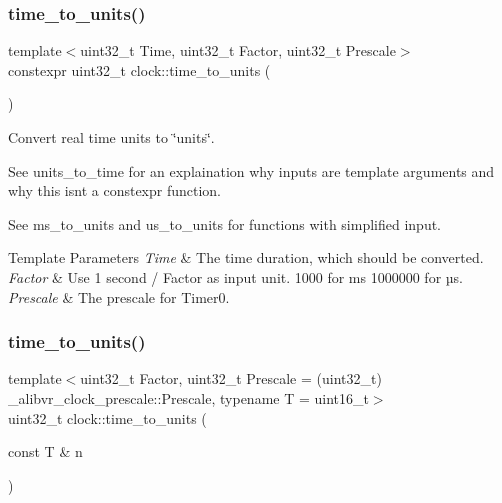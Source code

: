 \subsubsection{\texorpdfstring{time\+\_\+to\+\_\+units()}{time\_to\_units()}\hspace{0.1cm}{\footnotesize\ttfamily [1/2]}}
{\footnotesize\ttfamily template$<$uint32\+\_\+t Time, uint32\+\_\+t Factor, uint32\+\_\+t Prescale$>$ \\
constexpr uint32\+\_\+t clock\+::time\+\_\+to\+\_\+units (\begin{DoxyParamCaption}{ }\end{DoxyParamCaption})}



Convert real time units to \char`\"{}units\char`\"{}. 

See units\+\_\+to\+\_\+time for an explaination why inputs are template arguments and why this isn\textquotesingle{}t a constexpr function.

See ms\+\_\+to\+\_\+units and us\+\_\+to\+\_\+units for functions with simplified input.


\begin{DoxyTemplParams}{Template Parameters}
{\em Time} & The time duration, which should be converted. \\
\hline
{\em Factor} & Use 1 second / Factor as input unit. 1\textquotesingle{}000 for ms 1\textquotesingle{}000\textquotesingle{}000 for µs. \\
\hline
{\em Prescale} & The prescale for {\ttfamily Timer0}. \\
\hline
\end{DoxyTemplParams}
\hypertarget{namespaceclock_a46fd6e3a91d0b307eeea0500d03d12fb}{}\label{namespaceclock_a46fd6e3a91d0b307eeea0500d03d12fb} 
\subsubsection{\texorpdfstring{time\+\_\+to\+\_\+units()}{time\_to\_units()}\hspace{0.1cm}{\footnotesize\ttfamily [2/2]}}
{\footnotesize\ttfamily template$<$uint32\+\_\+t Factor, uint32\+\_\+t Prescale = (uint32\+\_\+t) \+\_\+alibvr\+\_\+clock\+\_\+prescale\+::\+Prescale, typename T  = uint16\+\_\+t$>$ \\
uint32\+\_\+t clock\+::time\+\_\+to\+\_\+units (\begin{DoxyParamCaption}\item[{const T \&}]{n }\end{DoxyParamCaption})\hspace{0.3cm}{\ttfamily [inline]}}



